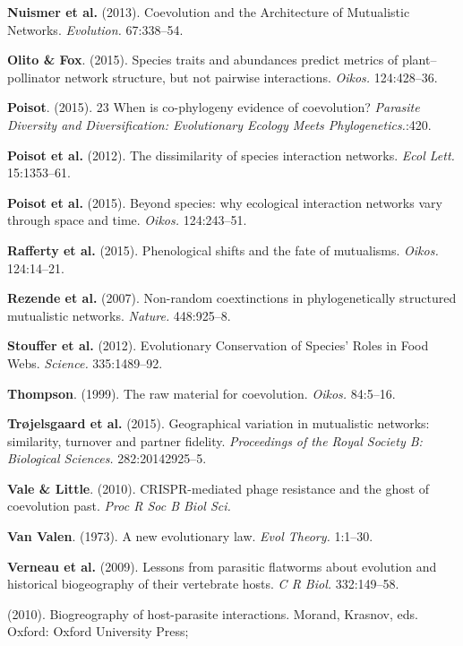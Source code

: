 \documentclass[12pt]{article}
\begin{document}
\hypertarget{ref-nuis13cam}{}
\textbf{Nuismer et al.} (2013). Coevolution and the Architecture of
Mutualistic Networks. \emph{Evolution.} 67:338--54.

\hypertarget{ref-olit15staa}{}
\textbf{Olito \& Fox}. (2015). Species traits and abundances predict
metrics of plant--pollinator network structure, but not pairwise
interactions. \emph{Oikos.} 124:428--36.

\hypertarget{ref-pois152wc}{}
\textbf{Poisot}. (2015). 23 When is co-phylogeny evidence of
coevolution? \emph{Parasite Diversity and Diversification: Evolutionary
Ecology Meets Phylogenetics.}:420.

\hypertarget{ref-pois12dsi}{}
\textbf{Poisot et al.} (2012). The dissimilarity of species interaction
networks. \emph{Ecol Lett.} 15:1353--61.

\hypertarget{ref-pois15swe}{}
\textbf{Poisot et al.} (2015). Beyond species: why ecological
interaction networks vary through space and time. \emph{Oikos.}
124:243--51.

\hypertarget{ref-raff15psf}{}
\textbf{Rafferty et al.} (2015). Phenological shifts and the fate of
mutualisms. \emph{Oikos.} 124:14--21.

\hypertarget{ref-reze07ncp}{}
\textbf{Rezende et al.} (2007). Non-random coextinctions in
phylogenetically structured mutualistic networks. \emph{Nature.}
448:925--8.

\hypertarget{ref-stou12ecs}{}
\textbf{Stouffer et al.} (2012). Evolutionary Conservation of Species'
Roles in Food Webs. \emph{Science.} 335:1489--92.

\hypertarget{ref-thom99rmc}{}
\textbf{Thompson}. (1999). The raw material for coevolution.
\emph{Oikos.} 84:5--16.

\hypertarget{ref-troj15gvm}{}
\textbf{Trøjelsgaard et al.} (2015). Geographical variation in
mutualistic networks: similarity, turnover and partner fidelity.
\emph{Proceedings of the Royal Society B: Biological Sciences.}
282:20142925--5.

\hypertarget{ref-vale10cpr}{}
\textbf{Vale \& Little}. (2010). CRISPR-mediated phage resistance and
the ghost of coevolution past. \emph{Proc R Soc B Biol Sci.}

\hypertarget{ref-van73nel}{}
\textbf{Van Valen}. (1973). A new evolutionary law. \emph{Evol Theory.}
1:1--30.

\hypertarget{ref-vern09lpf}{}
\textbf{Verneau et al.} (2009). Lessons from parasitic flatworms about
evolution and historical biogeography of their vertebrate hosts. \emph{C
R Biol.} 332:149--58.

\hypertarget{ref-mora10bhi}{}
(2010). Biogreography of host-parasite interactions. Morand, Krasnov,
eds. Oxford: Oxford University Press;
\end{document}

